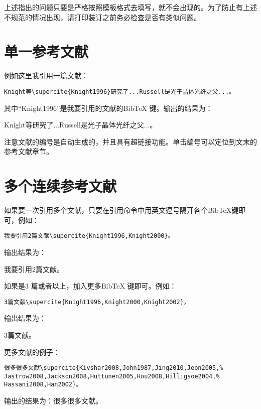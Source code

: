 上述指出的问题只要是严格按照模板格式去填写，就不会出现的。为了防止有上述不规范的情况出现，请打印装订之前务必检查是否有类似问题。


\section{单一参考文献}\label{section5-1}
例如这里我引用一篇文献：
\begin{verbatim}
Knight等\supercite{Knight1996}研究了...Russell是光子晶体光纤之父...。
\end{verbatim}
其中“Knight1996”是我要引用的文献的BibTeX 键。输出的结果为：

Knight等\supercite{jinyongboLiangLunZiPingHengXiaoCheDeSheJiYuShiXian2018}研究了...Russell是光子晶体光纤之父...。

注意文献的编号是自动生成的，并且具有超链接功能。单击编号可以定位到文末的参考文献章节。

\section{多个连续参考文献}\label{section5-2}
 如果要一次引用多个文献，只要在引用命令中用英文逗号隔开各个BibTeX键即可，例如：
 \begin{verbatim}
我要引用2篇文献\supercite{Knight1996,Knight2000}。
\end{verbatim}
输出结果为：

我要引用2篇文献\supercite{liuchunyangLiangLunZiPingHengXiaoCheDeXiTongSheJiYuShiXian2018,liuyongpengJiYuSTM32DeZhiNengPingHengCheSheJi2018}。


如果是3 篇或者以上，加入更多BibTeX 键即可。例如：
 \begin{verbatim}
3篇文献\supercite{Knight1996,Knight2000,Knight2002}。
\end{verbatim}
输出结果为：

3篇文献\supercite{lizijingJiYuDanPianJiDeLiangLunPingHengCheSheJi2020,panerweiJiYuSTM32DeLiangLunZiPingHengCheSheJiYuShiXian2018,pengDesignImplementationSelfbalancing2018}。

更多文献的例子：
 \begin{verbatim}
很多很多文献\supercite{Kivshar2008,John1987,Jing2010,Jeon2005,%
Jastrow2008,Jackson2008,Huttunen2005,Hou2008,Hilligsoe2004,%
Hassani2008,Han2002}。
\end{verbatim}

输出的结果为：很多很多文献\supercite{wangleiJiYuSTM32DeLiangLunZiPingHengXiaoCheKongZhiXiTongSheJi2018,wangwenJiYuZiTaiJianCeDeLiangLunZiPingHengCheKongZhiFangFaYanJiu2019,wenshuangyunLiangLunZiPingHengXiaoCheKongZhiSuanFaDeYanJiuYuYouHua2017,%
wuzhenleiYiZhongJiYuPIDSuanFaDeZiPingHengCheKongZhiXiTongSheJi2019,yangzhiqiangJiYuSTM32C8T6DeZhiNengErLunZiPingHengXiaoCheDeSheJi2020,zimitModellingExperimentalAnalysis2018,caichangtaoLiangLunXiaoCheZiPingHengKongZhiXiTongDeYanJiuYuSheJi2018,chenyuJiYuSTM32KongZhiDePingHengXiaoCheXiTongSheJi2020,%
chhotrayKinematicAnalysisTwoWheeled2016,congyuhuaLiangLunZiPingHengXiaoCheDeSheJiJiShiXian2020}。



